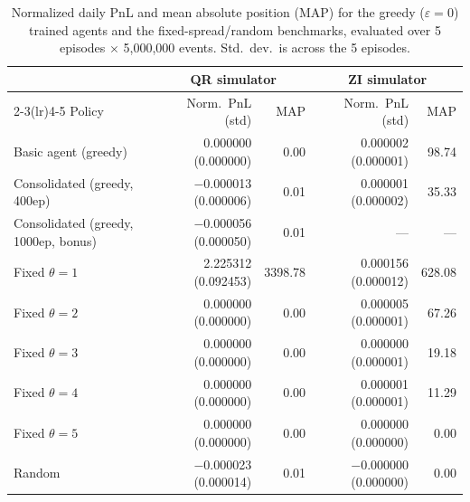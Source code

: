 \documentclass{article}
\begin{document}
\begin{table}[h]
\centering
\caption{Normalized daily PnL and mean absolute position (MAP) for the greedy ($\varepsilon=0$) trained agents and the fixed-spread/random benchmarks, evaluated over 5 episodes $\times$ 5{,}000{,}000 events. Std.\ dev.\ is across the 5 episodes.}
\label{tab:results}
\small
\begin{tabular}{@{}lrrrr@{}}
\toprule
 & \multicolumn{2}{c}{QR simulator} & \multicolumn{2}{c}{ZI simulator} \\
\cmidrule(lr){2-3}\cmidrule(lr){4-5}
Policy & Norm.\ PnL (std) & MAP & Norm.\ PnL (std) & MAP \\
\midrule
Basic agent (greedy)          & 0.000000 (0.000000) & 0.00    & 0.000002 (0.000001) & 98.74 \\
Consolidated (greedy, 400ep)  & $-$0.000013 (0.000006) & 0.01    & 0.000001 (0.000002) & 35.33 \\
Consolidated (greedy, 1000ep, bonus) & $-$0.000056 (0.000050) & 0.01 & --- & --- \\
Fixed $\theta=1$               & 2.225312 (0.092453) & 3398.78 & 0.000156 (0.000012) & 628.08 \\
Fixed $\theta=2$               & 0.000000 (0.000000) & 0.00    & 0.000005 (0.000001) & 67.26 \\
Fixed $\theta=3$               & 0.000000 (0.000000) & 0.00    & 0.000000 (0.000001) & 19.18 \\
Fixed $\theta=4$               & 0.000000 (0.000000) & 0.00    & 0.000001 (0.000001) & 11.29 \\
Fixed $\theta=5$               & 0.000000 (0.000000) & 0.00    & 0.000000 (0.000000) & 0.00 \\
Random                         & $-$0.000023 (0.000014) & 0.01    & $-$0.000000 (0.000000) & 0.00 \\
\bottomrule
\end{tabular}
\normalsize
\end{table}
\end{document}
